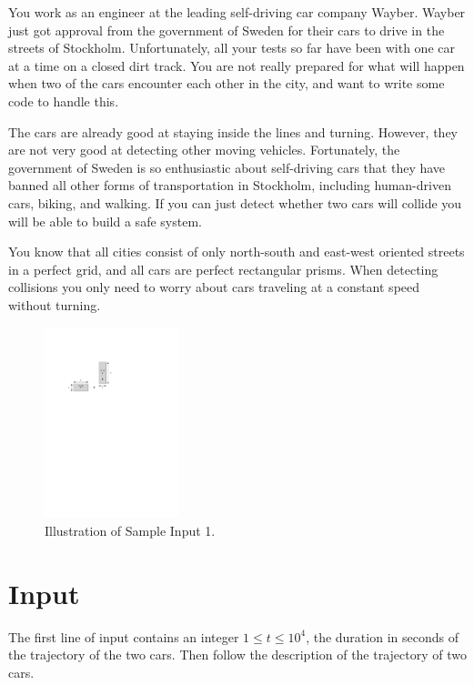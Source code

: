 
%
\noindent
You work as an engineer at the leading self-driving car company Wayber. Wayber
just got approval from the government of Sweden for their cars to drive in the
streets of Stockholm. Unfortunately, all your tests so far have been with one
car at a time on a closed dirt track. You are not really prepared for what will
happen when two of the cars encounter each other in the city, and want to write
some code to handle this.

The cars are already good at staying inside the lines and turning. However,
they are not very good at detecting other moving vehicles. Fortunately, the
government of Sweden is so enthusiastic about self-driving cars that they have
banned all other forms of transportation in Stockholm, including human-driven
cars, biking, and walking. If you can just detect whether two cars will collide
you will be able to build a safe system.

You know that all cities consist of only north-south and east-west oriented
streets in a perfect grid, and all cars are perfect rectangular prisms. When
detecting collisions you only need to worry about cars traveling at a constant
speed without turning.

\begin{figure}[!h]
\centering
\includegraphics[width=0.35\textwidth]{sample1}
\caption{Illustration of Sample Input 1.}
\end{figure}

\section*{Input}

The first line of input contains an integer $1 \le t \le 10^4$, the
duration in seconds of the trajectory of the two cars.
Then follow the description of the trajectory of two cars.

